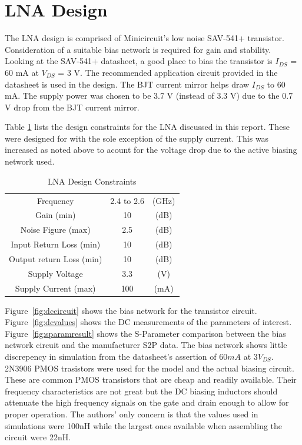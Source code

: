 \documentclass[conference]{IEEEtran}
\begin{document}
\section{LNA Design}
The LNA design is comprised of Minicircuit's low noise SAV-541+ transistor.  Consideration of a suitable bias network is required for gain and stability.  Looking at the SAV-541+ datasheet\cite{sav541datasheet}, a good place to bias the transistor is $I_{DS}$ = 60 mA at $V_{DS}$ = 3 V.  The recommended application circuit provided in the datasheet is used in the design.   The BJT current mirror helps draw $I_{DS}$ to 60 mA.  The supply power was chosen to be 3.7 V (instead of 3.3 V) due to the 0.7 V drop from the BJT current mirror.

Table \ref{tab:specs} lists the design constraints for the LNA discussed in this report. These were designed for with the sole exception of the supply current. This was increased as noted above to acount for the voltage drop due to the active biasing network used. 

\begin{table}[!b]
\caption{LNA Design Constraints}
\centering
    \begin{tabular}{c c c}
  	Frequency & 2.4 to 2.6 & (GHz)\\
	Gain (min) & 10 & (dB)\\
	Noise Figure (max) & 2.5 & (dB)\\
	Input Return Loss (min) & 10 & (dB)\\
	Output return Loss (min) & 10 & (dB)\\
	Supply Voltage & 3.3 & (V)\\
	Supply Current (max) & 100 & (mA)\\
    \end{tabular}
\label{tab:specs}
\end{table}

Figure~\ref{fig:dccircuit} shows the bias network for the transistor circuit.  Figure~\ref{fig:dcvalues} shows the DC measurements of the parameters of interest.  Figure~\ref{fig:sparamresult} shows the S-Parameter comparison between the bias network circuit and the manufacturer S2P data.  The bias network shows little discrepency in simulation from the datasheet's assertion of $60mA$ at $3V_{DS}$. 2N3906 PMOS trasistors were used for the model and the actual biasing circuit. These are common PMOS transistors that are cheap and readily available. Their frequency characteristics are not great but the DC biasing inductors should attenuate the high frequency signals on the gate and drain enough to allow for proper operation. The authors' only concern is that the values used in simulations were 100nH while the largest ones available when assembling the circuit were 22nH. 
\end{document}
